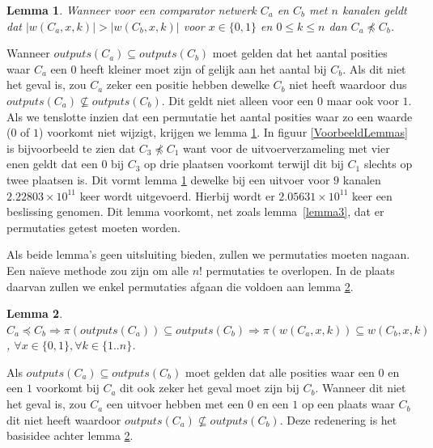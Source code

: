 \documentclass{article}
\newtheorem{lemma}{Lemma}
\begin{document}
\begin{lemma}
	Wanneer voor een comparator netwerk $C_a$ en $C_b$ met $n$ kanalen geldt dat $|w\left(C_a, x, k\right)| > |w\left(C_b, x, k\right)|$ voor $x \in \{0,1\}$ en $0 \leq k \leq n$ dan $C_a \npreceq C_b$.
	\label{lemma4}
\end{lemma}
Wanneer ${outputs(C_a) \subseteq outputs(C_b)}$ moet gelden dat het aantal posities waar $C_a$ een $0$ heeft kleiner moet zijn of gelijk aan het aantal bij $C_b$.
Als dit niet het geval is, zou $C_a$ zeker een positie hebben dewelke $C_b$ niet heeft waardoor dus ${outputs(C_a) \nsubseteq outputs(C_b)}$.
Dit geldt niet alleen voor een $0$ maar ook voor $1$.
Als we tenslotte inzien dat een permutatie het aantal posities waar zo een waarde ($0$ of $1$) voorkomt niet wijzigt, krijgen we lemma \ref{lemma4}.
In figuur \ref{VoorbeeldLemmas} is bijvoorbeeld te zien dat $C_3 \npreceq C_1$ want voor de uitvoerverzameling met vier enen geldt dat een $0$ bij $C_3$ op drie plaatsen voorkomt terwijl dit bij $C_1$ slechts op twee plaatsen is.
Dit vormt lemma \ref{lemma4} dewelke bij een uitvoer voor $9$ kanalen ${2.22803 \times 10^{11}}$ keer wordt uitgevoerd. Hierbij wordt er $2.05631 \times 10^{11}$ keer een beslissing genomen.
Dit lemma voorkomt, net zoals lemma~\ref{lemma3}, dat er permutaties getest moeten worden.

Als beide lemma's geen uitsluiting bieden, zullen we permutaties moeten nagaan.
Een na\"ieve methode zou zijn om alle $n!$ permutaties te overlopen.
In de plaats daarvan zullen we enkel permutaties afgaan die voldoen aan lemma \ref{lemma5}\cite{sortingNetworksSize2014}.
\begin{lemma}
	${C_a \preceq C_b  \Rightarrow \pi\left(outputs\left(C_{a}\right)\right) \subseteq outputs\left(C_{b}\right)} \Rightarrow \pi\left(w\left(C_a, x, k\right)\right) \subseteq w\left(C_b, x, k\right)$,
	${\forall x \in \{0,1\}, \forall k \in \{1..n\}}$.
\label{lemma5}
\end{lemma}

Als ${outputs(C_a) \subseteq outputs(C_b)}$ moet gelden dat alle posities waar een $0$ en een $1$ voorkomt bij $C_a$ dit ook zeker het geval moet zijn bij $C_b$.
Wanneer dit niet het geval is, zou $C_a$ een uitvoer hebben met een $0$ en een $1$ op een plaats waar $C_b$ dit niet heeft waardoor ${outputs(C_a) \nsubseteq outputs(C_b)}$.
Deze redenering is het basisidee achter lemma \ref{lemma5}.
\end{document}
